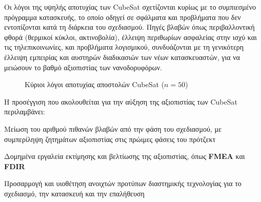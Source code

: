 \documentclass[a4paper,nobib]{tufte-book}
\begin{document}
Οι λόγοι της υψηλής αποτυχίας των CubeSat σχετίζονται κυρίως με το συμπιεσμένο πρόγραμμα κατασκευής, το οποίο οδηγεί σε σφάλματα και προβλήματα που δεν εντοπίζονται κατά τη διάρκεια του σχεδιασμού. Πηγές βλαβών όπως περιβαλλοντική φθορά (θερμικοί κύκλοι, ακτινοβολία), έλλειψη περιθωρίων ασφαλείας στην ισχύ και τις τηλεπικοινωνίες, και προβλήματα λογισμικού, συνδυάζονται με τη γενικότερη έλλειψη εμπειρίας και αυστηρών διαδικασιών των νέων κατασκευαστών, για να μειώσουν το βαθμό αξιοπιστίας των νανοδορυφόρων. \parencite{swartwout_cubesat_mission_2019,langer_reliability_estimation_2017}

\begin{figure}
\centering
{}  
\caption[Κύριοι λόγοι αποτυχίας αποστολών CubeSat]{Κύριοι λόγοι αποτυχίας αποστολών CubeSat (\(n=50\)) \parencite{bouwmeester_survey_implementation_2017}}
\label{fig:whyfail}
\end{figure}

Η προσέγγιση που ακολουθείται για την αύξηση της αξιοπιστίας των CubeSat περιλαμβάνει:
\begin{compactitem}
	\item Μείωση του αριθμού πιθανών βλαβών από την φάση του σχεδιασμού, με συμπερίληψη ζητημάτων αξιοπιστίας στις πρώιμες φάσεις του πρότζεκτ
	\item Δομημένα εργαλεία εκτίμησης και βελτίωσης της αξιοπιστίας, όπως \textbf{\acf{FMEA}} και \textbf{\acf{FDIR}} \autocite{faure_lean_satellites_2017,menchinelli_reliability_engineering_2018}
	\item Προσαρμογή και υιοθέτηση ανοιχτών προτύπων διαστημικής τεχνολογίας για το σχεδιασμό, την κατασκευή και την επαλήθευση \autocite{scholz_handbook_free_2021}
\end{compactitem}
\end{document}
